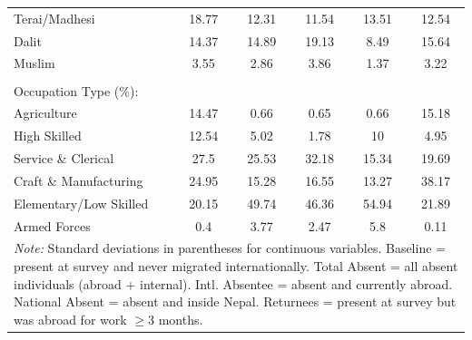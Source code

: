 \begin{landscape}
\begin{table}[!h]
{\begin{tabular}[t]{lccccc}
Terai/Madhesi & 18.77 & 12.31 & 11.54 & 13.51 & 12.54\\
Dalit & 14.37 & 14.89 & 19.13 & 8.49 & 15.64\\
\addlinespace
Muslim & 3.55 & 2.86 & 3.86 & 1.37 & 3.22\\
 &  &  &  &  & \\
Occupation Type (\%): &  &  &  &  & \\
Agriculture & 14.47 & 0.66 & 0.65 & 0.66 & 15.18\\
High Skilled & 12.54 & 5.02 & 1.78 & 10 & 4.95\\
\addlinespace
Service \& Clerical & 27.5 & 25.53 & 32.18 & 15.34 & 19.69\\
Craft \& Manufacturing & 24.95 & 15.28 & 16.55 & 13.27 & 38.17\\
Elementary/Low Skilled & 20.15 & 49.74 & 46.36 & 54.94 & 21.89\\
Armed Forces & 0.4 & 3.77 & 2.47 & 5.8 & 0.11\\
\bottomrule
\multicolumn{6}{l}{\rule{0pt}{1em}\textit{Note: } Standard deviations in parentheses for continuous variables. Baseline = present at survey and never migrated internationally. Total Absent = all absent individuals (abroad + internal). Intl. Absentee = absent and currently abroad. National Absent = absent and inside Nepal. Returnees = present at survey but was abroad for work $\geq$3 months.}\\
\end{tabular}}
\end{table}
\end{landscape}
